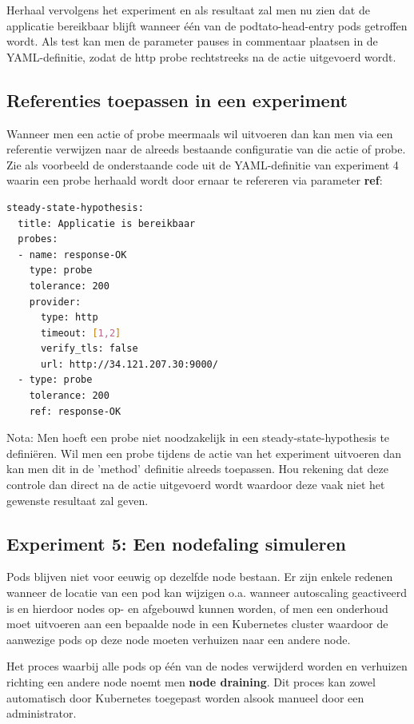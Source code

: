 Herhaal vervolgens het experiment en als resultaat zal men nu zien dat de applicatie bereikbaar blijft wanneer één van de podtato-head-entry pods getroffen wordt. Als test kan men de parameter pauses in commentaar plaatsen in de YAML-definitie, zodat de http probe rechtstreeks na de actie uitgevoerd wordt.  

\subsection{Referenties toepassen in een experiment}

Wanneer men een actie of probe meermaals wil uitvoeren dan kan men via een referentie verwijzen naar de alreeds bestaande configuratie van die actie of probe. Zie als voorbeeld de onderstaande code uit de YAML-definitie van experiment 4 waarin een probe herhaald wordt door ernaar te refereren via parameter {\bf ref}:  

\begin{lstlisting}[language=bash] 
steady-state-hypothesis:
  title: Applicatie is bereikbaar
  probes:
  - name: response-OK
    type: probe
    tolerance: 200
    provider:
      type: http
      timeout: [1,2]
      verify_tls: false
      url: http://34.121.207.30:9000/
  - type: probe 
    tolerance: 200
    ref: response-OK
\end{lstlisting}

Nota: Men hoeft een probe niet noodzakelijk in een steady-state-hypothesis te definiëren. Wil men  een probe tijdens de actie van het experiment uitvoeren dan kan men dit in de 'method' definitie alreeds toepassen. Hou rekening dat deze controle dan direct na de actie uitgevoerd wordt waardoor deze vaak niet het gewenste resultaat zal geven.

\subsection{Experiment 5: Een nodefaling simuleren}

Pods blijven niet voor eeuwig op dezelfde node bestaan. Er zijn enkele redenen wanneer de locatie van een pod kan wijzigen o.a. wanneer autoscaling geactiveerd is en hierdoor nodes op- en afgebouwd kunnen worden, of men een onderhoud moet uitvoeren aan een bepaalde node in een Kubernetes cluster waardoor de aanwezige pods op deze node moeten verhuizen naar een andere node. 

Het proces waarbij alle pods op één van de nodes verwijderd worden en verhuizen richting een andere node noemt men {\bf node draining}. Dit proces kan zowel automatisch door Kubernetes toegepast worden alsook manueel door een administrator. 

